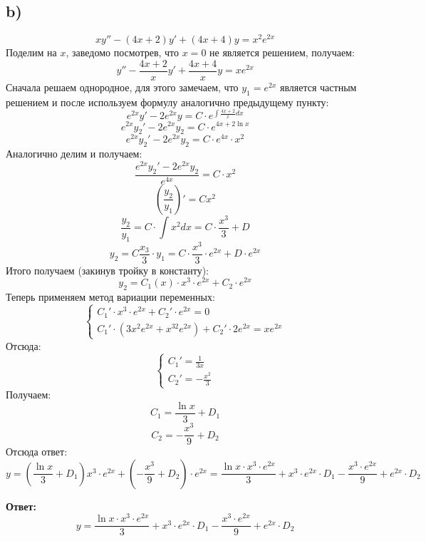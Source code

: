 \documentclass[a4paper,12pt]{article}
\begin{document}
\subsection*{b)}
\[
xy'' - (4x + 2)y' + (4x + 4)y = x^2 e^{2x}
\]
Поделим на $x$, заведомо посмотрев, что $x = 0$ не является решением, получаем:
\[
y'' - \frac{4x + 2}{x} y' + \frac{4x + 4}{x} y = x e^{2x}
\]
Сначала решаем однородное, для этого замечаем, что $y_1 = e^{2x}$ является частным решением и после используем формулу  аналогично предыдущему пункту:
\[
e^{2x} y'  - 2e^{2x} y = C \cdot e^{\int \frac{4x  + 2}{x} dx}
\]
\[
e^{2x} y_2'  - 2e^{2x} y_2  = C \cdot e^{4x + 2 \ln x}
\]
\[
e^{2x} y_2'  - 2e^{2x} y_2   = C \cdot e^{4x} \cdot x^2
\]
Аналогично делим и получаем:
\[
\frac{e^{2x} y_2'  - 2e^{2x} y_2 }{e^{4x}} = C \cdot x^2
\]
\[
\left(
\frac{y_2}{y_1}
\right) ' = C x^2
\]
\[
\frac{y_2}{y_1} = C \cdot \int x^2 dx  = C \cdot \frac{x^3}{3} + D 
\]
\[
y_2 = C \frac{x_3}{3} \cdot y_1  = C \cdot \frac{x^3}{3} \cdot e^{2x} + D \cdot e^{2x} 
\]
Итого получаем (закинув тройку в константу):
\[
y_2 =  C_1(x) \cdot  x^3 \cdot e^{2x} + C_2 \cdot e^{2x}
\]
Теперь применяем метод вариации переменных:
\[
\begin{cases}
C_1' \cdot x^3 \cdot e^{2x} + C_2' \cdot e^{2x} = 0 \\
C_1' \cdot (3x^2 e^{2x} + x^32 e^{2x})  + C_2' \cdot 2e^{2x} = xe^{2x}
\end{cases}
\]
Отсюда:
\[
\begin{cases}
C_1' = \frac{1}{3x} \\
C_2' = -\frac{x^2}{3}
\end{cases}
\]
Получаем:
\[
C_1 = \frac{\ln x}{3} + D_1 
\]
\[
C_2 = - \frac{x^3}{9} + D_2
\]
Отсюда ответ:
\[
y = 
\left(
 \frac{\ln x}{3} + D_1 
\right) x^3 \cdot e^{2x} + 
\left(
- \frac{x^3}{9} + D_2
\right) \cdot e^{2x} = \frac{\ln x \cdot x^3 \cdot e^{2x}}{3} + x^3 \cdot e^{2x} \cdot D_1  - \frac{x^3 \cdot e^{2x}}{9} + e^{2x} \cdot D_2
\]
\begin{center}
\textbf{Ответ: } 
\[
y =  \frac{\ln x \cdot x^3 \cdot e^{2x}}{3} + x^3 \cdot e^{2x} \cdot D_1  - \frac{x^3 \cdot e^{2x}}{9} + e^{2x} \cdot D_2
\]
\end{center}
\clearpage
\end{document}
